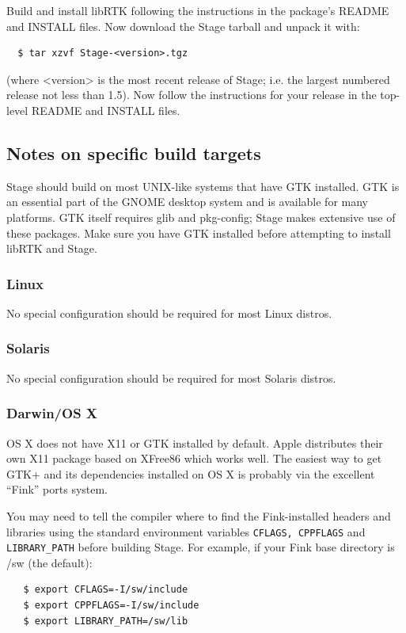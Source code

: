 \documentclass[letter,11pt,twoside]{report}
\begin{document}
\noindent Build and install libRTK following the instructions in the
package's README and INSTALL files. Now download the Stage tarball and
unpack it with:
\begin{verbatim}
  $ tar xzvf Stage-<version>.tgz
\end{verbatim}
\noindent (where <version> is the most recent release of Stage;
i.e. the largest numbered release not less than 1.5). Now follow the
instructions for your release in the top-level README and INSTALL
files.

\subsection{Notes on specific build targets}

Stage should build on most UNIX-like systems that have GTK
installed. GTK is an essential part of the GNOME desktop system and is
available for many platforms. GTK itself requires glib and pkg-config;
Stage makes extensive use of these packages. Make sure you have GTK
installed before attempting to install libRTK and Stage.

\subsubsection{Linux}
No special configuration should be required for most Linux distros.

\subsubsection{Solaris}

No special configuration should be required for most Solaris distros.

\subsubsection{Darwin/OS X}
OS X does not have X11 or GTK installed by default. Apple distributes
their own X11 package based on XFree86 which works well. The easiest
way to get GTK+ and its dependencies installed on OS X is probably via
the excellent ``Fink'' ports system.

You may need to tell the compiler where to find the Fink-installed
headers and libraries using the standard environment variables
\verb+CFLAGS, CPPFLAGS+ and \verb+LIBRARY_PATH+ before building
Stage. For example, if your Fink base directory is /sw (the default):

\begin{verbatim}
   $ export CFLAGS=-I/sw/include
   $ export CPPFLAGS=-I/sw/include
   $ export LIBRARY_PATH=/sw/lib
\end{verbatim}
\end{document}
